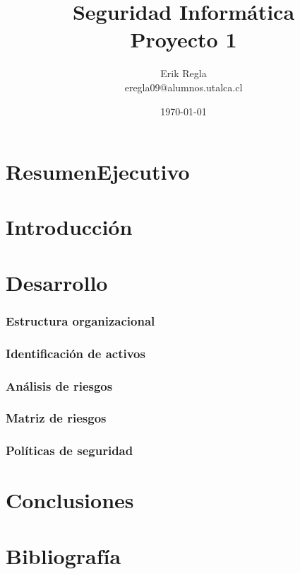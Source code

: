\documentclass[11pt]{utalcaDoc}
\title{{\bf Seguridad Informática}\\ Proyecto 1}
\author{Erik Regla\\ eregla09@alumnos.utalca.cl}
\date{\today}
\begin{document}
\maketitle

\newpage
\tableofcontents

\newpage
\part{ResumenEjecutivo}


\newpage
\part{Introducción}


\newpage
\part{Desarrollo}
\section{Estructura organizacional}


\section{Identificación de activos}



\section{Análisis de riesgos}



\section{Matriz de riesgos}


\section{Políticas de seguridad}


\newpage
\part{Conclusiones}

\newpage
\part{Bibliografía}
\end{document}
